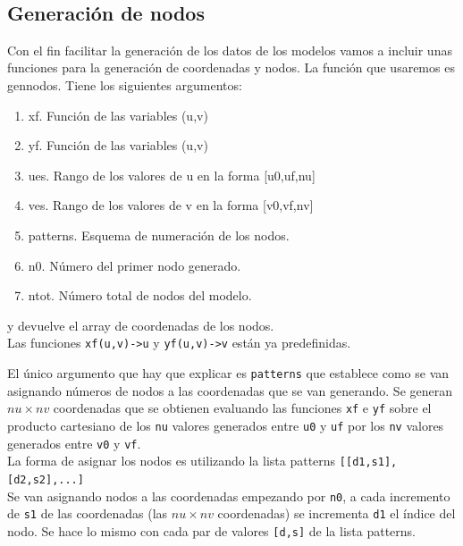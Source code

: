 \documentclass[11pt]{article}
\providecommand{\tightlist}{%
      \setlength{\itemsep}{0pt}\setlength{\parskip}{0pt}}
\begin{document}
    \begin{center}
    \end{center}
    { \hspace*{\fill} \\}
    
    \hypertarget{generaciuxf3n-de-nodos}{%
\subsection{Generación de nodos}\label{generaciuxf3n-de-nodos}}

Con el fin facilitar la generación de los datos de los modelos vamos a
incluir unas funciones para la generación de coordenadas y nodos. La
función que usaremos es gennodos. Tiene los siguientes argumentos:

\begin{enumerate}
\def\labelenumi{\arabic{enumi}.}
\tightlist
\item
  xf. Función de las variables (u,v)
\item
  yf. Función de las variables (u,v)
\item
  ues. Rango de los valores de u en la forma {[}u0,uf,nu{]}
\item
  ves. Rango de los valores de v en la forma {[}v0,vf,nv{]}
\item
  patterns. Esquema de numeración de los nodos.
\item
  n0. Número del primer nodo generado.
\item
  ntot. Número total de nodos del modelo.
\end{enumerate}

y devuelve el array de coordenadas de los nodos.\\
Las funciones \texttt{xf(u,v)-\textgreater{}u} y
\texttt{yf(u,v)-\textgreater{}v} están ya predefinidas.

El único argumento que hay que explicar es \texttt{patterns} que
establece como se van asignando números de nodos a las coordenadas que
se van generando. Se generan \(nu\times{}nv\) coordenadas que se
obtienen evaluando las funciones \texttt{xf} e \texttt{yf} sobre el
producto cartesiano de los \texttt{nu} valores generados entre
\texttt{u0} y \texttt{uf} por los \texttt{nv} valores generados entre
\texttt{v0} y \texttt{vf}.\\
La forma de asignar los nodos es utilizando la lista patterns
\texttt{{[}{[}d1,s1{]},{[}d2,s2{]},...{]}}\\
Se van asignando nodos a las coordenadas empezando por \texttt{n0}, a
cada incremento de \texttt{s1} de las coordenadas (las \(nu\times{}nv\)
coordenadas) se incrementa \texttt{d1} el índice del nodo. Se hace lo
mismo con cada par de valores \texttt{{[}d,s{]}} de la lista patterns.
\end{document}
